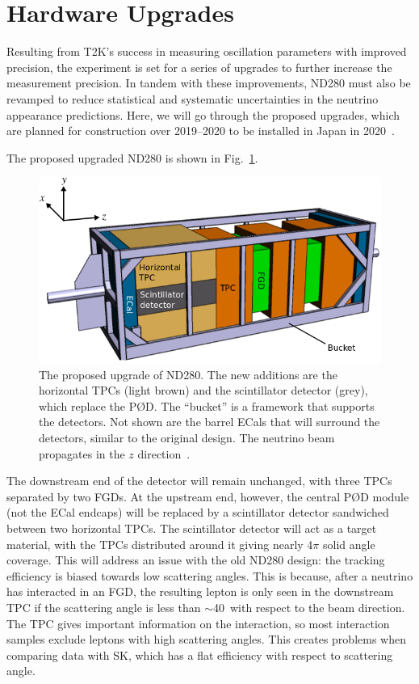\documentclass[aps,pra,12pt,notitlepage,tightenlines]{revtex4-1}
\begin{document}
\section{Hardware Upgrades}
Resulting from T2K's success in measuring oscillation parameters with improved precision, the experiment is set for a series of upgrades to further increase the measurement precision. In tandem with these improvements, ND280 must also be revamped to reduce statistical and systematic uncertainties in the neutrino appearance predictions. Here, we will go through the proposed upgrades, which are planned for construction over 2019--2020 to be installed in Japan in 2020~\cite{Blondel:2299599}.

The proposed upgraded ND280 is shown in Fig.\ \ref{fig:up}.
\begin{figure}
 \includegraphics[scale=0.5]{upgrade2.png}
 \caption{The proposed upgrade of ND280. The new additions are the horizontal TPCs (light brown) and the scintillator detector (grey), which replace the P\O D. The ``bucket'' is a framework that supports the detectors. Not shown are the barrel ECals that will surround the detectors, similar to the original design. The neutrino beam propagates in the $z$ direction~\cite{Blondel:2299599}.}
 \label{fig:up}
\end{figure}
The downstream end of the detector will remain unchanged, with three TPCs separated by two FGDs. At the upstream end, however, the central P\O D module (not the ECal endcaps) will be replaced by a scintillator detector sandwiched between two horizontal TPCs. The scintillator detector will act as a target material, with the TPCs distributed around it giving nearly 4$\pi$ solid angle coverage. This  will address an issue with the old ND280 design: the tracking efficiency is biased towards low scattering angles. This is because, after a neutrino has interacted in an FGD, the resulting lepton is only seen in the downstream TPC if the scattering angle is less than $\sim$40\degree\ with respect to the beam direction. The TPC gives important information on the interaction, so most interaction samples exclude leptons with high scattering angles. This creates problems when comparing data with SK, which has a flat efficiency with respect to scattering angle.
\end{document}
